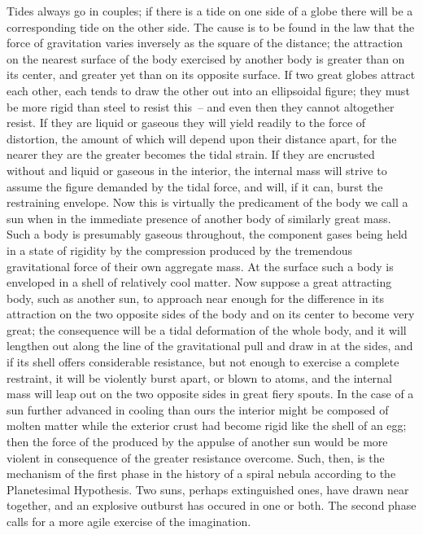 Tides always go in couples; if there is a tide on one side of a globe
there will be a corresponding tide on the other side. The cause is to
be found in the law that the force of gravitation varies inversely as
the square of the distance; the attraction on the nearest surface of
the body exercised by another body is greater than on its center, and
greater yet than on its opposite surface. If two great globes attract
each other, each tends to draw the other out into an ellipsoidal
figure; they must be more rigid than steel to resist this~-- and even
then they cannot altogether resist. If they are liquid or gaseous they
will yield readily to the force of distortion, the amount of which
will depend upon their distance apart, for the nearer they are the
greater becomes the tidal strain. If they are encrusted without and
liquid or gaseous in the interior, the internal mass will strive to
assume the figure demanded by the tidal force, and will, if it can,
burst the restraining envelope. Now this is virtually the predicament
of the body we call a sun when in the immediate presence of another
body of similarly great mass. Such a body is presumably gaseous
throughout, the component gases being held in a state of rigidity by
the compression produced by the tremendous gravitational force of
their own aggregate mass. At the surface such a body is enveloped in a
shell of relatively cool matter. Now suppose a great attracting body,
such as another sun, to approach near enough for the difference in its
attraction on the two opposite sides of the body and on its center to
become very great; the consequence will be a tidal deformation of the
whole body, and it will lengthen out along the line of the
gravitational pull and draw in at the sides, and if its shell offers
considerable resistance, but not enough to exercise a complete
restraint, it will be violently burst apart, or blown to atoms, and
the internal mass will leap out on the two opposite sides in great
fiery spouts. In the case of a sun further advanced in cooling than
ours the interior might be composed of molten matter while the
exterior crust had become rigid like the shell of an egg; then the
force of the  produced by the appulse of
another sun would be more violent in consequence of the greater
resistance overcome. Such, then, is the mechanism of the first phase
in the history of a spiral nebula according to the Planetesimal
Hypothesis. Two suns, perhaps extinguished ones, have drawn near
together, and an explosive outburst has occured in one or both. The
second phase calls for a more agile exercise of the imagination.


